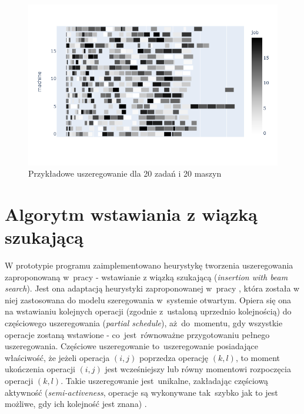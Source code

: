 \documentclass[brudnopis]{xmgr}
\begin{document}
\begin{figure}[!tbh]
\centering
\includegraphics[width=.8\hsize]{fig/newplot_trim20j20m.png}
\caption{Przykładowe uszeregowanie dla 20 zadań i 20 maszyn\label{diag:sched_20j420}}
\end{figure}
\medskip



\chapter{Algorytm wstawiania z wiązką szukającą}

W prototypie programu zaimplementowano heurystykę tworzenia uszeregowania zaproponowaną w~pracy \cite{grinshpoun2014partially} - wstawianie z wiązką szukającą (\emph{insertion with beam search}).
Jest ona adaptacją heurystyki zaproponowanej w~pracy \cite{brasel1993constructive}, która została w niej zastosowana do modelu szeregowania w~systemie otwartym.
Opiera się ona na wstawianiu kolejnych operacji (zgodnie z~ustaloną uprzednio kolejnością) do częściowego uszeregowania (\emph{partial schedule}), aż~do~momentu, gdy wszystkie operacje zostaną wstawione - co~jest~równoważne przygotowaniu pełnego uszeregowania. Częściowe uszeregowanie to~uszeregowanie posiadające właściwość, że jeżeli operacja $(i,j)$ poprzedza operację $(k,l)$, to moment ukończenia operacji $(i,j)$ jest wcześniejszy lub równy momentowi rozpoczęcia operacji $(k,l)$. Takie uszeregowanie jest~unikalne, zakładając częściową aktywność (\emph{semi-activeness}, operacje są wykonywane tak~szybko jak to jest możliwe, gdy ich kolejność jest znana) \cite{grinshpoun2014partially}.\\
\end{document}

